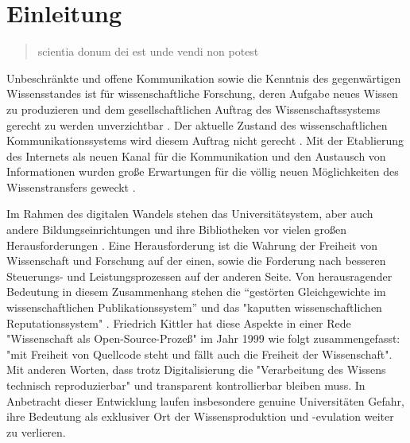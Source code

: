 \chapter{Einleitung} 
\begin{quote}
scientia donum dei est unde vendi non potest
\end{quote}Unbeschränkte und offene Kommunikation sowie die Kenntnis des gegenwärtigen Wissensstandes ist für wissenschaftliche Forschung, deren Aufgabe neues Wissen zu produzieren und dem gesellschaftlichen Auftrag des Wissenschaftssystems gerecht zu werden unverzichtbar \cite{Hanekop_2014} \cite{glaeser2006} \cite{gibbons_1994} \cite{Luhmann1998}. Der aktuelle Zustand des wissenschaftlichen Kommunikationssystems wird diesem Auftrag nicht gerecht \cite{suchen}. Mit der Etablierung des Internets als neuen Kanal für die Kommunikation und den Austausch von Informationen wurden große Erwartungen für die völlig neuen Möglichkeiten des Wissenstransfers geweckt \cite{Hanekop_2014} \cite{schulze_2013_open} \cite{albert_2006_open_implications} \cite{Goodrum_2001} \cite{Lawrence_1999}. 

Im Rahmen des digitalen Wandels stehen das Universitätsystem, aber auch andere Bildungseinrichtungen und ihre Bibliotheken vor vielen großen Herausforderungen \cite{Harter2006} \cite{Gu_don_2004} \cite{osterloh2008anreize}. Eine Herausforderung ist die Wahrung der Freiheit von Wissenschaft und Forschung auf der einen,  sowie die Forderung nach besseren Steuerungs- und Leistungsprozessen \cite{Adler_2009} \cite{gibbons_1994} auf der anderen Seite. Von herausragender Bedeutung in diesem Zusammenhang stehen die “gestörten Gleichgewichte im wissenschaftlichen Publikationssystem” \cite{cite:0} und das "kaputten wissenschaftlichen Reputationssystem" \cite{suchen}. Friedrich Kittler hat diese Aspekte in einer Rede "Wissenschaft als Open-Source-Prozeß" im Jahr 1999 wie folgt zusammengefasst: "mit Freiheit von Quellcode steht und fällt auch die Freiheit der Wissenschaft". Mit anderen Worten, dass trotz Digitalisierung die "Verarbeitung des Wissens technisch reproduzierbar" \cite{cite:1} und transparent kontrollierbar \cite{suchen} bleiben muss. In Anbetracht dieser Entwicklung laufen insbesondere genuine Universitäten Gefahr, ihre Bedeutung als exklusiver Ort der Wissensproduktion \cite{suchen} und -evulation \cite{suchen} weiter zu verlieren.


